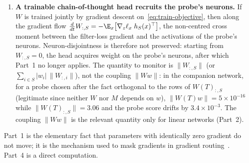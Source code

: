 \begin{theorem}
\begin{enumerate}
  \item \textbf{A trainable chain-of-thought head recruits the probe's neurons.} If $W$ is trained jointly by gradient descent on~\eqref{eq:train-objective}, then along the gradient flow $\tfrac{d}{dt} W_{:,S} = -\E_x\big[\nabla_z \ell_x\; h_S(x)^\top\big]$, the non-centred cross moment between the filter-loss gradient and the activations of the probe's neurons. Neuron-disjointness is therefore not preserved: starting from $W_{:,S} = 0$, the head acquires weight on the probe's neurons, after which Part~1 no longer applies. The quantity to monitor is $\|W_{:,S}\|$ (or $\sum_{i \in S} |w_i|\, \|W_{:,i}\|$), not the coupling $\|Ww\|$: in the companion network, for a probe chosen after the fact orthogonal to the rows of $W(T)_{:,S}$ (legitimate since neither $W$ nor $M$ depends on $w$), $\|W(T) w\| = 5 \times 10^{-16}$ while $\|W(T)_{:,S}\| = 3.06$ and the probe score drifts by $3.4 \times 10^{-3}$. The coupling $\|Ww\|$ is the relevant quantity only for linear networks (Part~2).
\end{enumerate}
\end{theorem}

Part~1 is the elementary fact that parameters with identically zero gradient do not move; it is the mechanism used to mask gradients in gradient routing~\cite{cloud2024}. Part~4 is a direct computation.

